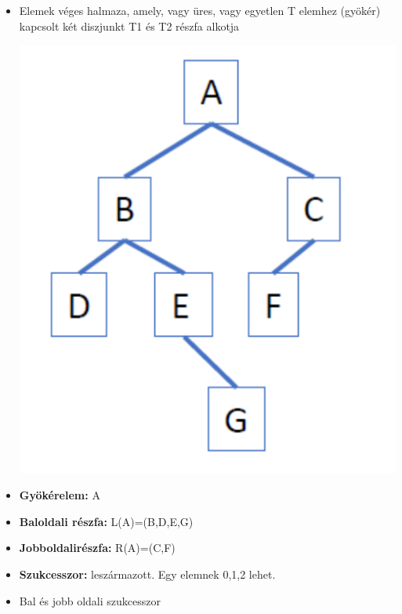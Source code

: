 \documentclass[11pt,a4paper]{article}
\begin{document}
            \begin{tcolorbox}[colback=blue!5!white,colframe=blue!50!black,title= 23. Ismertesse a bináris fák szerkezetét és tárolási lehetőségeit számítógépen!]
                \begin{itemize}
                    \item Elemek véges halmaza, amely, vagy üres, vagy egyetlen T elemhez (gyökér) kapcsolt két diszjunkt T1 és T2 részfa alkotja\\
                    \begin{center}
                        \includegraphics[scale = 0.3]{23_1.png}
                    \end{center}
                    \item \textbf{Gyökérelem:} A
                    \item \textbf{Baloldali részfa:} L(A)=(B,D,E,G)
                    \item \textbf{Jobboldalirészfa:} R(A)=(C,F)
                    \item \textbf{Szukcesszor:} leszármazott. Egy elemnek 0,1,2 lehet.
                    \item Bal és jobb oldali szukcesszor

\end{itemize}
\end{tcolorbox}
\end{document}
